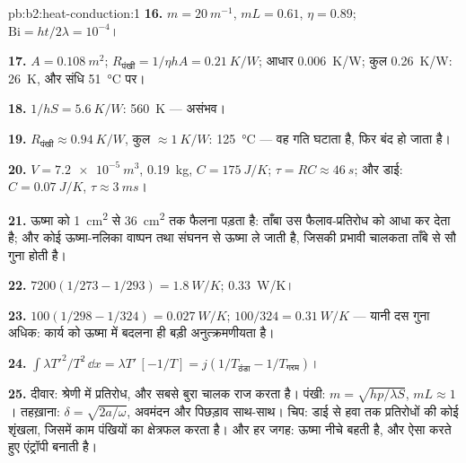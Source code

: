 \begin{solution}{pb:b2:heat-conduction:1}
\textbf{16.} $m = \qty{20}{m^{-1}}$, $mL = 0.61$, $\eta = 0.89$; $\mathrm{Bi} = ht/2\lambda
= 10^{-4}$।

\textbf{17.} $A = \qty{0.108}{m^2}$; $R_{\text{पंखी}} = 1/\eta hA = \qty{0.21}{K/W}$; आधार
\qty{0.006}{K/W}; कुल \qty{0.26}{K/W}: \qty{26}{K}, और संधि \qty{51}{\celsius} पर।

\textbf{18.} $1/hS = \qty{5.6}{K/W}$: \qty{560}{K} --- असंभव।

\textbf{19.} $R_{\text{पंखी}} \approx \qty{0.94}{K/W}$, कुल $\approx \qty{1}{K/W}$:
\qty{125}{\celsius} --- वह गति घटाता है, फिर बंद हो जाता है।

\textbf{20.} $V = \qty{7.2e-5}{m^3}$, \qty{0.19}{kg}, $C = \qty{175}{J/K}$; $\tau = RC
\approx \qty{46}{s}$; और डाई: $C = \qty{0.07}{J/K}$, $\tau \approx \qty{3}{ms}$।

\textbf{21.} ऊष्मा को \qty{1}{cm^2} से \qty{36}{cm^2} तक फैलना पड़ता है: ताँबा
उस फैलाव-प्रतिरोध को आधा कर देता है; और कोई ऊष्मा-नलिका वाष्पन तथा संघनन से
ऊष्मा ले जाती है, जिसकी प्रभावी चालकता ताँबे से सौ गुना
होती है।

\textbf{22.} $7200(1/273 - 1/293) = \qty{1.8}{W/K}$; \qty{0.33}{W/K}।

\textbf{23.} $100(1/298 - 1/324) = \qty{0.027}{W/K}$; $100/324 = \qty{0.31}{W/K}$ ---
यानी दस गुना अधिक: कार्य को ऊष्मा में बदलना ही बड़ी अनुत्क्रमणीयता है।

\textbf{24.} $\int\lambda T'^2/T^2\,\dd x = \lambda T'\,[-1/T] = j(1/T_{\text{ठंडा}} -
1/T_{\text{गरम}})$।

\textbf{25.} दीवार: श्रेणी में प्रतिरोध, और सबसे बुरा चालक राज करता है।
पंखी: $m = \sqrt{hp/\lambda S}$, $mL \approx 1$। तहख़ाना: $\delta = \sqrt{2a/\omega}$,
अवमंदन और पिछड़ाव साथ-साथ। चिप: डाई से हवा तक प्रतिरोधों की कोई
शृंखला, जिसमें काम पंखियों का क्षेत्रफल करता है। और हर जगह: ऊष्मा नीचे बहती है, और
ऐसा करते हुए एंट्रॉपी बनाती है।
\end{solution}
